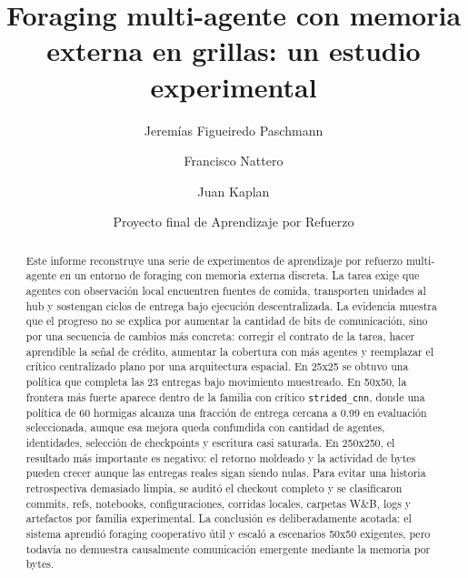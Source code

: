 \documentclass[11pt,a4paper]{article}
\title{\textbf{Foraging multi-agente con memoria externa en grillas: un estudio experimental}}
\author{Jeremías Figueiredo Paschmann \and Francisco Nattero \and Juan Kaplan}
\date{Proyecto final de Aprendizaje por Refuerzo}
\newcommand{\run}[1]{\nolinkurl{#1}}
\begin{document}
\maketitle

\begin{abstract}
Este informe reconstruye una serie de experimentos de aprendizaje por refuerzo multi-agente en un entorno de foraging con memoria externa discreta. La tarea exige que agentes con observación local encuentren fuentes de comida, transporten unidades al hub y sostengan ciclos de entrega bajo ejecución descentralizada. La evidencia muestra que el progreso no se explica por aumentar la cantidad de bits de comunicación, sino por una secuencia de cambios más concreta: corregir el contrato de la tarea, hacer aprendible la señal de crédito, aumentar la cobertura con más agentes y reemplazar el crítico centralizado plano por una arquitectura espacial. En 25x25 se obtuvo una política que completa las 23 entregas bajo movimiento muestreado. En 50x50, la frontera más fuerte aparece dentro de la familia con crítico \run{strided_cnn}, donde una política de 60 hormigas alcanza una fracción de entrega cercana a 0.99 en evaluación seleccionada, aunque esa mejora queda confundida con cantidad de agentes, identidades, selección de checkpoints y escritura casi saturada. En 250x250, el resultado más importante es negativo: el retorno moldeado y la actividad de bytes pueden crecer aunque las entregas reales sigan siendo nulas. Para evitar una historia retrospectiva demasiado limpia, se auditó el checkout completo y se clasificaron commits, refs, notebooks, configuraciones, corridas locales, carpetas W\&B, logs y artefactos por familia experimental. La conclusión es deliberadamente acotada: el sistema aprendió foraging cooperativo útil y escaló a escenarios 50x50 exigentes, pero todavía no demuestra causalmente comunicación emergente mediante la memoria por bytes.
\end{abstract}
\end{document}
